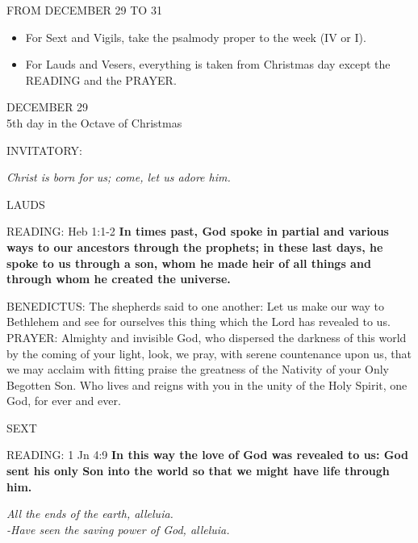 \begin{center}\normalsize\uppercase{FROM DECEMBER 29 TO 31\\}
\end{center}
\begin{flushleft}
\begin{itemize}\tiny
\item {For Sext and Vigils, take the psalmody proper to the week (IV or I).}
\item {For Lauds and Vesers, everything is taken from Christmas day except the READING and the PRAYER.}
\end{itemize}
\end{flushleft}


\begin{center}\normalsize\uppercase{DECEMBER 29\\}
\footnotesize{5th day in the Octave of Christmas}
\end{center}

\noindent\small{\uppercase{INVITATORY:}}\normalsize
\begin{center}
\textit{Christ is born for us; come, let us adore him.\\}
\end{center}
\begin{flushleft}\normalsize{\uppercase{LAUDS\\}}\end{flushleft}
\noindent\small{\uppercase{READING:}}    Heb 1:1-2 \textbf{    In times past, God spoke in partial and various ways to our ancestors through the prophets; in these last days, he spoke to us through a son, whom he made heir of all things and through whom he created the universe.\\}

\noindent\small{\uppercase{BENEDICTUS:}}	The shepherds said to one another: Let us make our way to Bethlehem and see for ourselves this thing which the Lord has revealed to us.\\

\noindent\small{\uppercase{PRAYER:}}	Almighty and invisible God, who dispersed the darkness of this world by the coming of your light, look, we pray, with serene countenance upon us, that we may acclaim with fitting praise the greatness of the Nativity of your Only Begotten Son. Who lives and reigns with you in the unity of the Holy Spirit, one God, for ever and ever.

\begin{flushleft}\normalsize{\uppercase{SEXT\\}}\end{flushleft}
\noindent\small{\uppercase{READING:}}    1 Jn 4:9 \textbf{     In this way the love of God was revealed to us: God sent his only Son into the world so that we might have life through him.}
\begin{center}\textit{All the ends of the earth, alleluia.\\
-Have seen the saving power of God, alleluia.}
\end{center}

